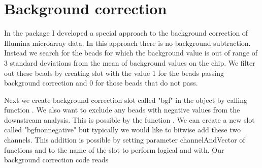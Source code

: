 \section{Background correction}
In the  package I developed a special approach to the background correction of Illumina microarray data. In this approach there is no background subtraction. Instead we search for the beads for which the background value is out of range of 3 standard deviations from the mean of background values on the chip. We filter out these beads by creating slot with the value 1 for the beads passing background correction and 0 for those beads that do not pass.

Next we create background correction slot called "bgf" in the  object by calling function . We also want to exclude any beads with negative values from the downstream analysis. This is possible by the function . We can create a new slot called "bgfnonnegative" but typically we would like to bitwise add these two channels. This addition is possible by setting parameter channelAndVector of functions  and  to the name of the slot to perform logical and with. Our background correction code reads